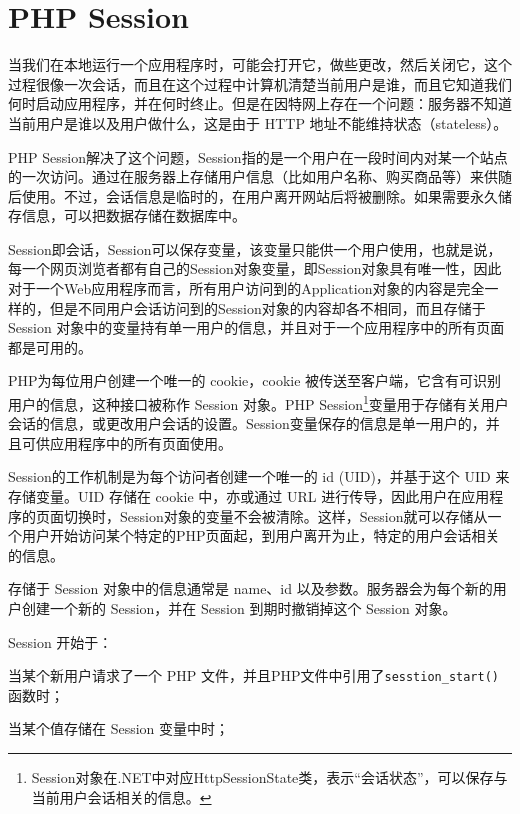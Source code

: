 \chapter{PHP Session}

当我们在本地运行一个应用程序时，可能会打开它，做些更改，然后关闭它，这个过程很像一次会话，而且在这个过程中计算机清楚当前用户是谁，而且它知道我们何时启动应用程序，并在何时终止。但是在因特网上存在一个问题：服务器不知道当前用户是谁以及用户做什么，这是由于 HTTP 地址不能维持状态（stateless）。

PHP Session解决了这个问题，Session指的是一个用户在一段时间内对某一个站点的一次访问。通过在服务器上存储用户信息（比如用户名称、购买商品等）来供随后使用。不过，会话信息是临时的，在用户离开网站后将被删除。如果需要永久储存信息，可以把数据存储在数据库中。

Session即会话，Session可以保存变量，该变量只能供一个用户使用，也就是说，每一个网页浏览者都有自己的Session对象变量，即Session对象具有唯一性，因此对于一个Web应用程序而言，所有用户访问到的Application对象的内容是完全一样的，但是不同用户会话访问到的Session对象的内容却各不相同，而且存储于Session 对象中的变量持有单一用户的信息，并且对于一个应用程序中的所有页面都是可用的。




PHP为每位用户创建一个唯一的 cookie，cookie 被传送至客户端，它含有可识别用户的信息，这种接口被称作 Session 对象。PHP Session\footnote{Session对象在.NET中对应HttpSessionState类，表示“会话状态”，可以保存与当前用户会话相关的信息。}变量用于存储有关用户会话的信息，或更改用户会话的设置。Session变量保存的信息是单一用户的，并且可供应用程序中的所有页面使用。







Session的工作机制是为每个访问者创建一个唯一的 id (UID)，并基于这个 UID 来存储变量。UID 存储在 cookie 中，亦或通过 URL 进行传导，因此用户在应用程序的页面切换时，Session对象的变量不会被清除。这样，Session就可以存储从一个用户开始访问某个特定的PHP页面起，到用户离开为止，特定的用户会话相关的信息。 

存储于 Session 对象中的信息通常是 name、id 以及参数。服务器会为每个新的用户创建一个新的 Session，并在 Session 到期时撤销掉这个 Session 对象。

Session 开始于：

\begin{compactitem}
\item 当某个新用户请求了一个 PHP 文件，并且PHP文件中引用了\texttt{sesstion\_start()}函数时；
\item 当某个值存储在 Session 变量中时；
\end{compactitem}

